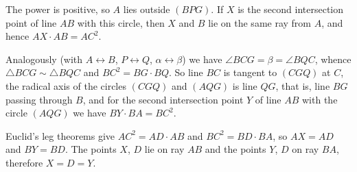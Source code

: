 {    The power is positive, so $A$ lies outside $(BPG)$. If $X$ is the second intersection point of line $AB$ with this circle, then $X$ and $B$ lie on the same ray from $A$, and hence $AX \cdot AB = AC^2$.

    Analogously (with $A \leftrightarrow B$, $P \leftrightarrow Q$, $\alpha \leftrightarrow \beta$) we have $\angle BCG = \beta = \angle BQC$, whence $\triangle BCG \sim \triangle BQC$ and $BC^2 = BG \cdot BQ$. So line $BC$ is tangent to $(CGQ)$ at $C$, the radical axis of the circles $(CGQ)$ and $(AQG)$ is line $QG$, that is, line $BG$ passing through $B$, and for the second intersection point $Y$ of line $AB$ with the circle $(AQG)$ we have $BY \cdot BA = BC^2$.

    Euclid's leg theorems give $AC^2 = AD \cdot AB$ and $BC^2 = BD \cdot BA$, so $AX = AD$ and $BY = BD$. The points $X$, $D$ lie on ray $AB$ and the points $Y$, $D$ on ray $BA$, therefore $X = D = Y$.
}

